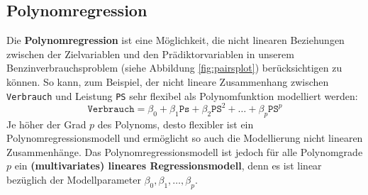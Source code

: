 \documentclass[
  ngerman,
]{book}
\begin{document}
\hypertarget{polynomregression}{%
\subsection{Polynomregression}\label{polynomregression}}

Die \textbf{Polynomregression} ist eine Möglichkeit, die nicht linearen Beziehungen zwischen der Zielvariablen und den Prädiktorvariablen in unserem Benzinverbrauchsproblem (siehe Abbildung \ref{fig:pairsplot}) berücksichtigen zu können. So kann, zum Beispiel, der nicht lineare Zusammenhang zwischen \texttt{Verbrauch} und Leistung \texttt{PS} sehr flexibel als Polynomfunktion modelliert werden:
\[
\texttt{Verbrauch}=\beta_0 + \beta_1 \texttt{Ps} + \beta_2 \texttt{PS}^2 + \dots + \beta_p \texttt{PS}^p
\]
Je höher der Grad \(p\) des Polynoms, desto flexibler ist ein Polynomregressionsmodell und ermöglicht so auch die Modellierung nicht linearen Zusammenhänge. Das Polynomregressionsmodell ist jedoch für alle Polynomgrade \(p\) ein \textbf{(multivariates) lineares Regressionsmodell}, denn es ist linear bezüglich der Modellparameter \(\beta_0, \beta_1, \dots, \beta_p\).
\end{document}
